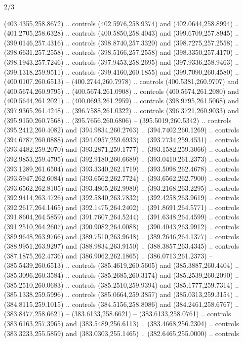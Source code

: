 \begin{flagdescription}{2/3}
\begin{scope}[xshift=0.5\flaglength,yshift=0.5\flagwidth,scale=\flagwidth/495.65]
\begin{scope}[y=0.8pt, x=0.8pt, yscale=-1,shift={(-463.76,-309.78)}]
  (403.4355,258.8672) .. controls (402.5976,258.9374) and (402.0644,258.8994) ..
  (401.2705,258.6328) .. controls (400.5850,258.4043) and (399.6709,257.8945) ..
  (399.0146,257.4316) .. controls (398.8740,257.3320) and (398.7275,257.2558) ..
  (398.6631,257.2558) .. controls (398.5166,257.2558) and (398.3350,257.4170) ..
  (398.1943,257.7246) .. controls (397.9453,258.2695) and (397.9336,258.9463) ..
  (399.1318,259.9511) .. controls (399.4160,260.1855) and (399.7090,260.4580) ..
  (400.0107,260.6513) -- (400.2744,260.7978) .. controls (400.5381,260.9707) and
  (400.5674,260.9795) .. (400.5674,261.0908) .. controls (400.5674,261.2080) and
  (400.5644,261.2021) .. (400.0693,261.2959) .. controls (398.9795,261.5068) and
  (397.9365,261.4248) .. (396.7588,261.0322) .. controls (396.3721,260.9033) and
  (395.9150,260.7568) .. (395.7656,260.6806) -- (395.5019,260.5342) .. controls
  (395.2412,260.4082) and (394.9834,260.2763) .. (394.7402,260.1269) .. controls
  (394.6787,260.0888) and (394.0957,259.6933) .. (393.7734,259.4531) .. controls
  (393.4482,259.2070) and (393.2871,259.1777) .. (393.1582,259.3066) .. controls
  (392.9853,259.4795) and (392.9180,260.6689) .. (393.0410,261.2373) .. controls
  (393.1289,261.6504) and (393.3340,262.1719) .. (393.5098,262.4678) .. controls
  (393.5947,262.6084) and (393.6562,262.7724) .. (393.6562,262.7900) .. controls
  (393.6562,262.8105) and (393.4805,262.9980) .. (393.2168,263.2295) .. controls
  (392.9414,263.4726) and (392.5840,263.7832) .. (392.4258,263.9619) .. controls
  (392.2617,264.1465) and (392.1475,264.2402) .. (391.8691,264.5771) .. controls
  (391.8604,264.5859) and (391.7607,264.5244) .. (391.6348,264.4599) .. controls
  (391.2510,264.2607) and (390.9082,264.0088) .. (390.4043,263.9912) .. controls
  (389.9648,263.9766) and (389.7510,263.9648) .. (389.2646,264.1377) .. controls
  (388.9951,263.9297) and (388.9834,263.9150) .. (388.3857,263.4345) .. controls
  (387.1875,262.4736) and (386.9062,262.1865) .. (386.0713,261.2373) --
  (385.5439,260.6513) .. controls (385.4619,260.5605) and (385.3887,260.4404) ..
  (385.3096,260.3584) .. controls (385.2685,260.3174) and (385.2539,260.2090) ..
  (385.2510,260.0683) .. controls (385.2510,259.9394) and (385.1777,259.7314) ..
  (385.1338,259.5996) .. controls (385.0664,259.3857) and (385.0313,259.3154) ..
  (384.8115,259.1015) .. controls (384.5156,258.8086) and (384.2461,258.6767) ..
  (383.8477,258.6621) -- (383.6133,258.6621) -- (383.6133,258.0761) .. controls
  (383.6163,257.3965) and (383.5489,256.6113) .. (383.4668,256.2304) .. controls
  (383.3233,255.5859) and (383.0303,255.1465) .. (382.6465,255.0000) .. controls

\end{scope}
\end{scope}
\end{flagdescription}
